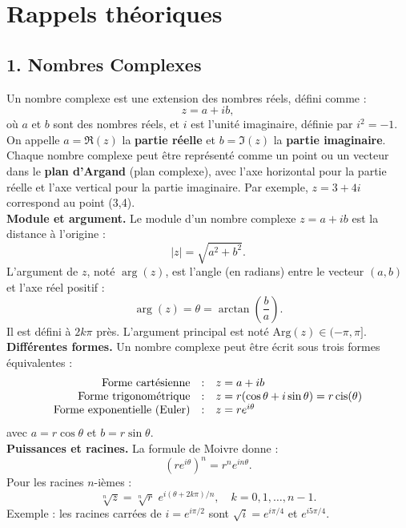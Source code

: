 
\section*{Rappels théoriques}
\subsection*{1. Nombres Complexes}

Un nombre complexe est une extension des nombres réels, défini comme :
\[
z = a + ib,
\]
où \( a \) et \( b \) sont des nombres réels, et \( i \) est l'unité imaginaire, définie par \( i^2 = -1 \). 
On appelle \( a = \Re(z) \) la \textbf{partie réelle} et \( b = \Im(z) \) la \textbf{partie imaginaire}. \\

Chaque nombre complexe peut être représenté comme un point ou un vecteur dans le \textbf{plan d’Argand} 
(plan complexe), avec l’axe horizontal pour la partie réelle et l’axe vertical pour la partie imaginaire. 
Par exemple, \( z = 3 + 4i \) correspond au point (3,4). \\

\textbf{Module et argument.} 
Le module d’un nombre complexe \( z = a + ib \) est la distance à l’origine :
\[
|z| = \sqrt{a^2 + b^2}.
\]
L’argument de \( z \), noté \( \arg(z) \), est l’angle (en radians) entre le vecteur \((a,b)\) et l’axe réel positif :
\[
\arg(z) = \theta = \arctan\!\left(\frac{b}{a}\right).
\]
Il est défini à \(2k\pi\) près. L’argument principal est noté \(\mathrm{Arg}(z) \in (-\pi,\pi]\). \\

\textbf{Différentes formes.}
Un nombre complexe peut être écrit sous trois formes équivalentes :
\[
\begin{array}{rcl}
\text{Forme cartésienne} &:& z = a + ib \\
\text{Forme trigonométrique} &:& z = r (\cos \theta + i \sin \theta) = r \operatorname{cis}(\theta) \\
\text{Forme exponentielle (Euler)} &:& z = r e^{i\theta}
\end{array}
\]
avec \(a = r \cos \theta\) et \(b = r \sin \theta\). \\

\textbf{Puissances et racines.}
La formule de Moivre donne :
\[
(r e^{i\theta})^n = r^n e^{in\theta}.
\]
Pour les racines \(n\)-ièmes :
\[
\sqrt[n]{z} = \sqrt[n]{r}\; e^{i(\theta + 2k\pi)/n}, \quad k=0,1,\dots,n-1.
\]
Exemple : les racines carrées de \( i = e^{i\pi/2} \) sont
\(\sqrt{i} = e^{i\pi/4}\) et \( e^{i5\pi/4} \). \\

